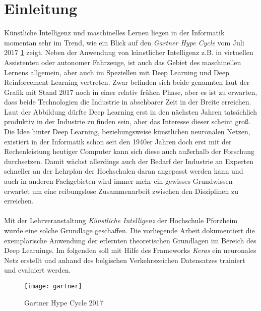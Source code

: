 
\section{Einleitung}
Künstliche Intelligenz und maschinelles Lernen liegen in der Informatik momentan sehr im Trend, wie ein Blick auf den \textit{Gartner Hype Cycle} vom Juli 2017 \ref{pic:gartner} \cite{gartner} zeigt. Neben der Anwendung von künstlicher Intelligenz z.B. in virtuellen Assistenten oder autonomer Fahrzeuge, ist auch das Gebiet des maschinellen Lernens allgemein, aber auch im Speziellen mit Deep Learning und Deep Reinforcement Learning vertreten. Zwar befinden sich beide genannten laut der Grafik mit Stand 2017 noch in einer relativ frühen Phase, aber es ist zu erwarten, dass beide Technologien die Industrie in absehbarer Zeit in der Breite erreichen. Laut der Abbildung dürfte Deep Learning erst in den nächsten Jahren tatsächlich produktiv in der Industrie zu finden sein, aber das Interesse dieser scheint groß. 
Die Idee hinter Deep Learning, beziehungsweise künstlichen neuronalen Netzen, existiert in der Informatik schon seit den 1940er Jahren \cite{Kriesel2007NeuralNetworks} doch erst mit der Rechenleistung heutiger Computer kann sich diese auch außerhalb der Forschung durchsetzen. 
Damit wächst allerdings auch der Bedarf der Industrie an Experten schneller an der Lehrplan der Hochschulen daran angepasst werden kann und auch in anderen Fachgebieten wird immer mehr ein gewisses Grundwissen erwartet um eine reibungslose Zusammenarbeit zwischen den Disziplinen zu erreichen. \\
\\
Mit der Lehrveranstaltung \textit{Künstliche Intelligenz} der Hochschule Pforzheim wurde eine solche Grundlage geschaffen. Die vorliegende Arbeit dokumentiert die exemplarische Anwendung der erlernten theoretischen Grundlagen im Bereich des Deep Learnings. Im folgenden soll mit Hilfe des Frameworks \textit{Keras} ein neuronales Netz erstellt und anhand des belgischen Verkehrszeichen Datensatzes trainiert und evaluiert werden. 

\begin{figure} [H]
	\centering
	\texttt{[image: gartner]}
	\caption{Gartner Hype Cycle 2017 \cite{gartner}}
	\label{pic:gartner}
\end{figure}

